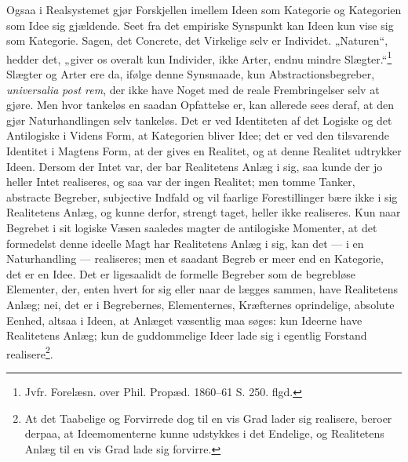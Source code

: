 \documentclass[11pt]{book}
\newcommand{\opage}[1]{\marginnote{\footnotesize\textit{[#1]}}}
\begin{document}
Ogsaa i Realsystemet gjør Forskjellen imellem Ideen som Kategorie og
Kategorien som Idee sig gjældende. Seet fra det empiriske Synspunkt kan
Ideen kun vise sig som Kategorie. Sagen, det Concrete, det Virkelige selv
er Individet. „Naturen“, hedder det, „giver os overalt kun Individer,
ikke Arter, endnu mindre Slægter.“\footnote{Jvfr. Forelæsn. over Phil.
Propæd. 1860--61 S. 250. flgd.} Slægter og Arter ere da, ifølge denne
Synsmaade, kun Abstractionsbegreber, \textit{universalia}
\emph{\textit{post rem}}, der ikke have Noget med de reale
Frembringelser selv at gjøre. Men hvor tankeløs en saadan Opfattelse er,
kan allerede sees deraf, at den gjør Naturhandlingen selv tankeløs. Det
er ved Identiteten af det Logiske og det Antilogiske i Videns Form, at
Kategorien bliver Idee; det er ved den tilsvarende Identitet i Magtens
Form, at der gives en Realitet, og at denne Realitet udtrykker Ideen.
Dersom der Intet var, der bar Realitetens Anlæg i sig, saa kunde der jo
heller Intet realiseres, og saa var der ingen Realitet; men tomme Tanker,
abstracte Begreber, subjective Indfald og vil\-%
\opage{224} \setcounter{footnote}{0}%
faarlige Forestillinger bære ikke i sig Realitetens Anlæg, og kunne
derfor, strengt taget, heller ikke realiseres. Kun naar Begrebet i sit
logiske Væsen saaledes magter de antilogiske Momenter, at det formedelst
denne ideelle Magt har Realitetens Anlæg i sig, kan det --- i en
Naturhandling --- realiseres; men et saadant Begreb er meer end en
Kategorie, det er en Idee. Det er ligesaalidt de formelle Begreber som de
begrebløse Elementer, der, enten hvert for sig eller naar de lægges
sammen, have Realitetens Anlæg; nei, det er i Begrebernes, Elementernes,
Kræfternes oprindelige, absolute Eenhed, altsaa i Ideen, at Anlæget
væsentlig maa søges: kun Ideerne have Realitetens Anlæg; kun de
guddommelige Ideer lade sig i egentlig Forstand realisere\footnote{At det
Taabelige og Forvirrede dog til en vis Grad lader sig realisere, beroer
derpaa, at Ideemomenterne kunne udstykkes i det Endelige, og Realitetens
Anlæg til en vis Grad lade sig forvirre.}.
\end{document}
